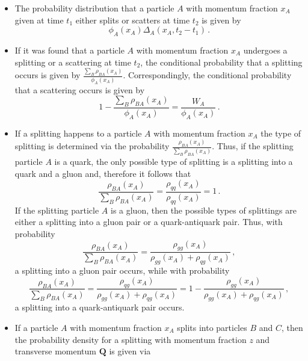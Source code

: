 \documentclass[preprint,12pt]{elsarticle}
\begin{document}
\begin{itemize}
    \item The probability distribution that a particle $A$ with momentum fraction $x_A$ given at time $t_1$ either splits or scatters at time $t_2$ is given by 
    \begin{equation}
        \phi_A(x_A)\Delta_A(x_A,t_2-t_1)\,.
        \label{eq:interactiontime}
    \end{equation}
    \item If it was found that a particle $A$ with momentum fraction $x_A$ undergoes a splitting or a scattering at time $t_2$, the conditional probability that a splitting occurs is given by $\frac{\sum_B\rho_{BA}(x_A)}{\phi_A(x_A)}$. Correspondingly, the conditional probability that a scattering occurs is given by 
    \begin{equation}
       1-\frac{\sum_B\rho_{BA}(x_A)}{\phi_A(x_A)}=\frac{W_A}{\phi_A(x_A)}\,.
       \label{eq:scat}
    \end{equation}
    \item 
    If a splitting happens to a particle $A$ with momentum fraction $x_A$ the type of splitting is determined 
    via the probability
    $\frac{\rho_{BA}(x_A)}{\sum_B\rho_{BA}(x_A)}$.
    Thus, if the splitting particle $A$ is a quark, the only possible type of splitting is a splitting into a quark and a gluon and, therefore it follows that 
    \begin{equation}
            \frac{\rho_{BA}(x_A)}{\sum_B\rho_{BA}(x_A)}=\frac{\rho_{qq}(x_A)}{\rho_{qq}(x_A)}=1\,.
            \label{eq:prob_qq}
    \end{equation}
    If the splitting particle $A$ is a gluon, then the possible types of splittings are either a splitting into a gluon pair or a quark-antiquark pair.
    Thus, with probability 
    \begin{equation}
            \frac{\rho_{BA}(x_A)}{\sum_B\rho_{BA}(x_A)}=\frac{\rho_{gg}(x_A)}{\rho_{gg}(x_A)+\rho_{qg}(x_A)}\,,
\label{eq:prob_gg}
    \end{equation}
    a splitting into a gluon pair occurs, while with probability 
    \begin{equation}
          \frac{\rho_{BA}(x_A)}{\sum_B\rho_{BA}(x_A)}=\frac{\rho_{qg}(x_A)}{\rho_{gg}(x_A)+\rho_{qg}(x_A)}=1-\frac{\rho_{gg}(x_A)}{\rho_{gg}(x_A)+\rho_{qg}(x_A)}\,,
          \label{eq:prob_gq}
    \end{equation}
 a splitting into a quark-antiquark pair occurs.
    \item If a particle $A$ with momentum fraction $x_A$ splits into particles $B$ and $C$, then the probability density for a splitting with momentum fraction $z$ and transverse momentum $\mathbf{Q}$ is given via 

\end{itemize}
\end{document}
